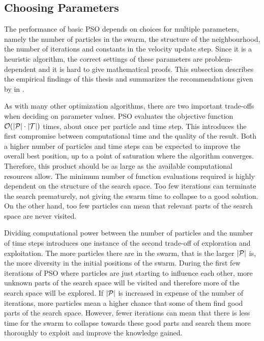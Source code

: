 \subsection{Choosing Parameters}
The performance of basic PSO depends on choices for multiple parameters, namely the number of particles in the swarm, the structure of the neighbourhood, the number of iterations and constants in the velocity update step.
Since it is a heuristic algorithm, the correct settings of these parameters are problem-dependent and it is hard to give mathematical proofs.
This subsection describes the empirical findings of this thesis and summarizes the recommendations given by \citeauthor{engelbrecht_fundamentals_2006} in \cite{engelbrecht_fundamentals_2006}.

As with many other optimization algorithms, there are two important trade-offs when deciding on parameter values.
PSO evaluates the objective function $\Oh(\abs{\Pe} \cdot \abs{\Tee})$ times, about once per particle and time step.
This introduces the first compromise between computational time and the quality of the result.
Both a higher number of particles and time steps can be expected to improve the overall best position, up to a point of saturation where the algorithm converges.
Therefore, this product should be as large as the available computational resources allow.
The minimum number of function evaluations required is highly dependent on the structure of the search space.
Too few iterations can terminate the search prematurely, not giving the swarm time to collapse to a good solution.
On the other hand, too few particles can mean that relevant parts of the search space are never visited.

Dividing computational power between the number of particles and the number of time steps introduces one instance of the second trade-off of exploration and exploitation.
The more particles there are in the swarm, that is the larger $\abs{\Pe}$ is, the more diversity in the initial positions of the swarm.
During the first few iterations of PSO where particles are just starting to influence each other, more unknown parts of the search space will be visited and therefore more of the search space will be explored.
If $\abs{\Pe}$ is increased in expense of the number of iterations, more particles mean a higher chance that some of them find good parts of the search space.
However, fewer iterations can mean that there is less time for the swarm to collapse towards these good parts and search them more thoroughly to exploit and improve the knowledge gained.

